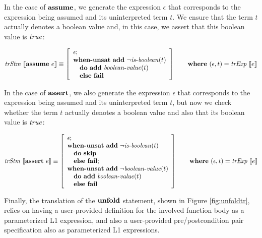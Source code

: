 In the case of $\textbf{assume}$, we generate the expression $\epsilon$ that 
corresponds to the expression being assumed and its uninterpreted term $t$. 
We ensure that the term $t$ actually denotes a boolean value and, in this 
case, we assert that this boolean value is $\mathit{true}$:

\[
\mathit{trStm}~\llbracket\textbf{assume}~e\rrbracket \equiv 
\left[\begin{array}{l}
\epsilon;\\
\textbf{when-unsat}~\textbf{add}~\neg\mathit{is\mbox{-}boolean}(t)\\
\quad\textbf{do}~\textbf{add}~\mathit{boolean\mbox{-}value}(t)\\
\quad\textbf{else}~\textbf{fail}\\
\end{array}\right]
\qquad \textbf{where}~(\epsilon, t) = \mathit{trExp}~\llbracket e\rrbracket
\]

In the case of $\textbf{assert}$, we also generate the expression $\epsilon$ that 
corresponds to the expression being assumed and its uninterpreted term $t$, but
now we check whether the term $t$ actually denotes a boolean value and also that
its boolean value is $\mathit{true}$:

\[
\mathit{trStm}~\llbracket\textbf{assert}~e\rrbracket \equiv
\left[\begin{array}{l}
\epsilon;\\
\textbf{when-unsat}~\textbf{add}~\neg\mathit{is\mbox{-}boolean}(t)\\
\quad\textbf{do}~\textbf{skip}\\
\quad\textbf{else}~\textbf{fail};\\
\textbf{when-unsat}~\textbf{add}~\neg\mathit{boolean\mbox{-}value}(t)\\
\quad\textbf{do}~\textbf{add}~\mathit{boolean\mbox{-}value}(t)\\
\quad\textbf{else}~\textbf{fail}\\
\end{array}\right]
\qquad \textbf{where}~(\epsilon, t) = \mathit{trExp}~\llbracket e\rrbracket
\]

Finally, the translation of the $\textbf{unfold}$ statement, shown in Figure 
\ref{fig:unfoldtr}, relies on having a user-provided definition for the involved
function body as a parameterized L1 expression, and also a user-provided
pre/postcondition pair specification also as parameterized L1 expressions.

